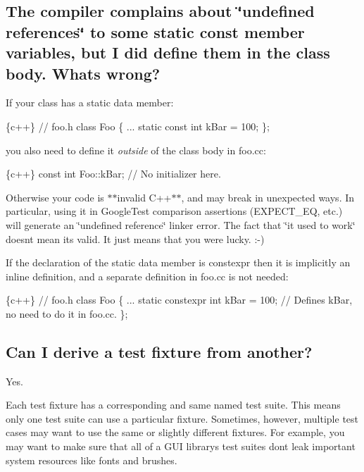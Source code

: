 \subsection*{The compiler complains about \char`\"{}undefined references\char`\"{} to some static const member variables, but I did define them in the class body. What\textquotesingle{}s wrong?}

If your class has a static data member\+:


\begin{DoxyCode}
\{c++\}
// foo.h
class Foo \{
  ...
  static const int kBar = 100;
\};
\end{DoxyCode}


you also need to define it {\itshape outside} of the class body in {\ttfamily foo.\+cc}\+:


\begin{DoxyCode}
\{c++\}
const int Foo::kBar;  // No initializer here.
\end{DoxyCode}


Otherwise your code is $\ast$$\ast$invalid C++$\ast$$\ast$, and may break in unexpected ways. In particular, using it in Google\+Test comparison assertions ({\ttfamily E\+X\+P\+E\+C\+T\+\_\+\+EQ}, etc.) will generate an \char`\"{}undefined reference\char`\"{} linker error. The fact that \char`\"{}it used to
work\char`\"{} doesn\textquotesingle{}t mean it\textquotesingle{}s valid. It just means that you were lucky. \+:-\/)

If the declaration of the static data member is {\ttfamily constexpr} then it is implicitly an {\ttfamily inline} definition, and a separate definition in {\ttfamily foo.\+cc} is not needed\+:


\begin{DoxyCode}
\{c++\}
// foo.h
class Foo \{
  ...
  static constexpr int kBar = 100;  // Defines kBar, no need to do it in foo.cc.
\};
\end{DoxyCode}


\subsection*{Can I derive a test fixture from another?}

Yes.

Each test fixture has a corresponding and same named test suite. This means only one test suite can use a particular fixture. Sometimes, however, multiple test cases may want to use the same or slightly different fixtures. For example, you may want to make sure that all of a G\+UI library\textquotesingle{}s test suites don\textquotesingle{}t leak important system resources like fonts and brushes.

